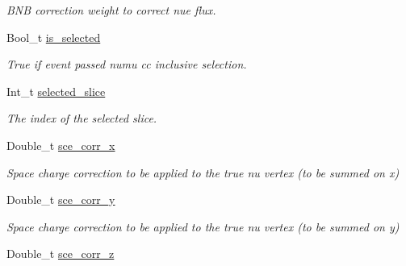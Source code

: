 \begin{DoxyCompactItemize}
\begin{DoxyCompactList}\small\item\em B\-N\-B correction weight to correct nue flux. \end{DoxyCompactList}\item 
\hypertarget{classUBXSecEvent_a6af1830fbdf3bb5df9087095941cf8ec}{Bool\-\_\-t \hyperlink{classUBXSecEvent_a6af1830fbdf3bb5df9087095941cf8ec}{is\-\_\-selected}}\label{classUBXSecEvent_a6af1830fbdf3bb5df9087095941cf8ec}

\begin{DoxyCompactList}\small\item\em True if event passed numu cc inclusive selection. \end{DoxyCompactList}\item 
\hypertarget{classUBXSecEvent_ae930518dc565c14fb73272cbcd45201c}{Int\-\_\-t \hyperlink{classUBXSecEvent_ae930518dc565c14fb73272cbcd45201c}{selected\-\_\-slice}}\label{classUBXSecEvent_ae930518dc565c14fb73272cbcd45201c}

\begin{DoxyCompactList}\small\item\em The index of the selected slice. \end{DoxyCompactList}\item 
\hypertarget{classUBXSecEvent_ab4b9884593f36f28932d283f48fa1c43}{Double\-\_\-t \hyperlink{classUBXSecEvent_ab4b9884593f36f28932d283f48fa1c43}{sce\-\_\-corr\-\_\-x}}\label{classUBXSecEvent_ab4b9884593f36f28932d283f48fa1c43}

\begin{DoxyCompactList}\small\item\em Space charge correction to be applied to the true nu vertex (to be summed on x) \end{DoxyCompactList}\item 
\hypertarget{classUBXSecEvent_af00760d1a8cc63d2c71f13a6a95c6982}{Double\-\_\-t \hyperlink{classUBXSecEvent_af00760d1a8cc63d2c71f13a6a95c6982}{sce\-\_\-corr\-\_\-y}}\label{classUBXSecEvent_af00760d1a8cc63d2c71f13a6a95c6982}

\begin{DoxyCompactList}\small\item\em Space charge correction to be applied to the true nu vertex (to be summed on y) \end{DoxyCompactList}\item 
\hypertarget{classUBXSecEvent_a458269123d7dd4085f071252f3f5741c}{Double\-\_\-t \hyperlink{classUBXSecEvent_a458269123d7dd4085f071252f3f5741c}{sce\-\_\-corr\-\_\-z}}\label{classUBXSecEvent_a458269123d7dd4085f071252f3f5741c}


\end{DoxyCompactItemize}
